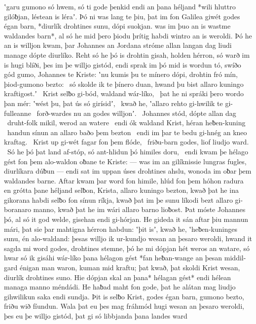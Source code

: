 ʽgaru gumono só hwem, só ti gode þenkid
endi an þana héljand *wili hluttro gilóƀjan,
léstean is léraʼ. Þó ni was lang te þiu,
þat im fon Galilea giwét godes égan barn,
*diurlík drohtines sunu, dópi suokjan.
was im þuo an is wastme waldandes barn*,
al só he mid þero þiodu þrítig habdi
wintro an is weroldi. Þó he an is willjon kwam,
þar Johannes an Jordana stróme
allan langan dag liudi manage
dópte diurlíko. Reht só he þó is drohtin gisah,
holden hérron, só warð im is hugi blíði,
þes im þe willjo gistód, endi sprak im þó mid is wordun tó,
swíðo gód gumo, Johannes te Kriste:
ʽnu kumis þu te mínero dópi, drohtin fró mín,
þiod-gumono bezto: \hld\ só skolde ik te þínero duan,
hwand þu bist allaro kuningo kraftigost.ʼ \hld\ Krist selƀo gi-bód,
waldand wár-líko, \hld\ þat he ni spráki þero wordo þan mér:
ʽwést þu, þat ús só girísidʼ, \hld\ kwað he, ʽallaro rehto gi-hwilik
te gi-fulleanne \hld\ forð-wardes nu
an godes willjonʼ. \hld\ Johannes stód,
dópte allan dag \hld\ druht-folk mikil,
werod an watere \hld\ endi ók waldand Krist,
héran heƀen-kuning \hld\ handun sínun
an allaro baðo þem bezton \hld\ endi im þar te bedu gi-hnég
an kneo kraftag. \hld\ Krist up gi-wét
fagar fon þem flóde, \hld\ friðu-barn godes,
liof liudjo ward. \hld\ Só he þó þat land af-stóp,
só ant-hlidun þó himiles doru, \hld\ endi kwam þe hélago gést
fon þem alo-waldon oƀane te Kriste:
— was im an gilíknissie lungras fugles,
diurlíkara dúƀun — endi sat im uppan úses drohtines ahslu,
wonoda im oƀar þem waldandes barne. Aftar kwam þar word fon himile,
hlúd fon þem hóhon radura en grótta þane héljand selƀon,
Krista, allaro kuningo bezton, kwað þat he ina gikorana habdi
selƀo fon sínun ríkja, kwað þat im þe sunu líkodi
bezt allaro gi-boranaro manno, kwað þat he im wári allaro barno lioƀost.
Þat móste Johannes þó, al só it god welde,
gisehan endi gi-hórjan. He gideda it sán aftar þiu
mannun mári, þat sie þar mahtigna
hérron habdun: ʽþit isʼ, kwað he, ʽheƀen-kuninges sunu,
én alo-waldand: þesas willjo ik ur-kundjo
wesan an þesaro weroldi, hwand it sagda mi word godes,
drohtines stemne, þó he mi dópjan hét
weros an watare, só hwar só ik gisáhi wár-líko
þana hélagon gést *fan heƀan-wange
an þesan middil-gard énigan man waron,
kuman mid kraftu; þat kwað, þat skoldi Krist wesan,
diurlík drohtines suno. Hie dópjan skal
an þana* hélagan gést* endi hélean managa
manno méndádi. He haƀad maht fon gode,
þat he alátan mag liudjo gihwilikun
saka endi sundja. Þit is selƀo Krist,
godes égan barn, gumono bezto,
friðu wið fíundun. Wala þat eu þes mag fráhmód hugi
wesan an þesaro weroldi, þes eu þe willjo gistód,
þat gi só libbjanda þana landes ward
